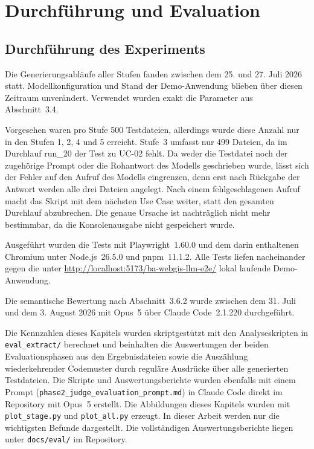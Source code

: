 \newpage
\section{Durchführung und Evaluation}

\subsection{Durchführung des Experiments}

Die Generierungsabläufe aller Stufen fanden zwischen dem 25. und 27. Juli 2026 statt. Modellkonfiguration und Stand der Demo-Anwendung blieben über diesen Zeitraum unverändert. Verwendet wurden exakt die Parameter aus Abschnitt~3.4.

Vorgesehen waren pro Stufe 500 Testdateien, allerdings wurde diese Anzahl nur in den Stufen 1, 2, 4 und 5 erreicht. Stufe~3 umfasst nur 499 Dateien, da im Durchlauf run\_20 der Test zu UC-02 fehlt. Da weder die Testdatei noch der zugehörige Prompt oder die Rohantwort des Modells geschrieben wurde, lässt sich der Fehler auf den Aufruf des Modells eingrenzen, denn erst nach Rückgabe der Antwort werden alle drei Dateien angelegt. Nach einem fehlgeschlagenen Aufruf macht das Skript mit dem nächsten Use Case weiter, statt den gesamten Durchlauf abzubrechen. Die genaue Ursache ist nachträglich nicht mehr bestimmbar, da die Konsolenausgabe nicht gespeichert wurde.

Ausgeführt wurden die Tests mit Playwright~1.60.0 und dem darin enthaltenen Chromium unter Node.js~26.5.0 und pnpm~11.1.2. Alle Tests liefen nacheinander gegen die unter \url{http://localhost:5173/ba-webgis-llm-e2e/} lokal laufende Demo-Anwendung.

Die semantische Bewertung nach Abschnitt~3.6.2 wurde zwischen dem 31. Juli und dem 3. August 2026 mit Opus~5 über Claude Code~2.1.220 durchgeführt.

Die Kennzahlen dieses Kapitels wurden skriptgestützt mit den Analyseskripten in \texttt{eval\_extract/} berechnet und beinhalten die Auswertungen der beiden Evaluationsphasen aus den Ergebnisdateien sowie die Auszählung wiederkehrender Codemuster durch reguläre Ausdrücke über alle generierten Testdateien. Die Skripte und Auswertungsberichte wurden ebenfalls mit einem Prompt (\texttt{phase2\_judge\_evaluation\_prompt.md}) in Claude Code direkt im Repository mit Opus~5 erstellt. Die Abbildungen dieses Kapitels wurden mit \texttt{plot\_stage.py} und \texttt{plot\_all.py} erzeugt. In dieser Arbeit werden nur die wichtigsten Befunde dargestellt. Die vollständigen Auswertungsberichte liegen unter \texttt{docs/eval/} im Repository.

